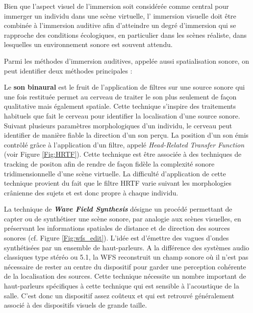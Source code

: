 Bien que l'aspect visuel de l'immersion soit considérée comme central pour immerger un individu dans une scène virtuelle, l' immersion visuelle doit être combinée à l'immersion auditive afin d'atteindre un degré d'immersion qui se rapproche des conditions écologiques, en particulier dans les scènes réaliste, dans lesquelles un environnement sonore est souvent attendu.

Parmi les méthodes d'immersion auditives, appelée aussi spatialisation sonore, on peut identifier deux méthodes principales :

Le \textbf{son binaural} est le fruit de l'application de filtres sur une source sonore qui une fois restituée permet au cerveau de traiter le son plus seulement de façon qualitative mais également spatiale. Cette technique s'inspire des traitements habituels que fait le cerveau pour identifier la localisation d'une source sonore. Suivant plusieurs paramètres morphologiques d'un individu, le cerveau peut identifier de manière fiable la direction d'un son perçu. La position d'un son émis contrôlé grâce à l'application d'un filtre, appelé \textit{Head-Related Transfer Function} (voir Figure \ref{Fig:HRTF}). Cette technique est être associée à des techniques de tracking de positon afin de rendre de façon fidèle la complexité sonore tridimensionnelle d'une scène virtuelle. La difficulté d'application de cette technique provient du fait que le filtre HRTF varie suivant les morphologies crânienne des sujets et est donc propre à chaque individu.

La technique de \textit{\textbf{Wave Field Synthesis}} désigne un procédé permettant de capter ou de synthétiser une scène sonore, par analogie aux scènes visuelles, en préservant les informations spatiales de distance et de direction des sources sonores (cf. Figure \ref{Fig:wfs_edit}). L'idée est d'émettre des vagues d'ondes synthétisées par un ensemble de haut-parleurs. A la différence des systèmes audio classiques type stéréo ou 5.1, la WFS reconstruit un champ sonore où il n'est pas nécessaire de rester au centre du dispositif pour garder une perception cohérente de la localisation des sources.
Cette technique nécessite un nombre important de haut-parleurs spécifiques à cette technique qui est sensible à l'acoustique de la salle. C'est donc un dispositif assez coûteux et qui est retrouvé généralement associé à des dispositifs visuels de grande taille.

